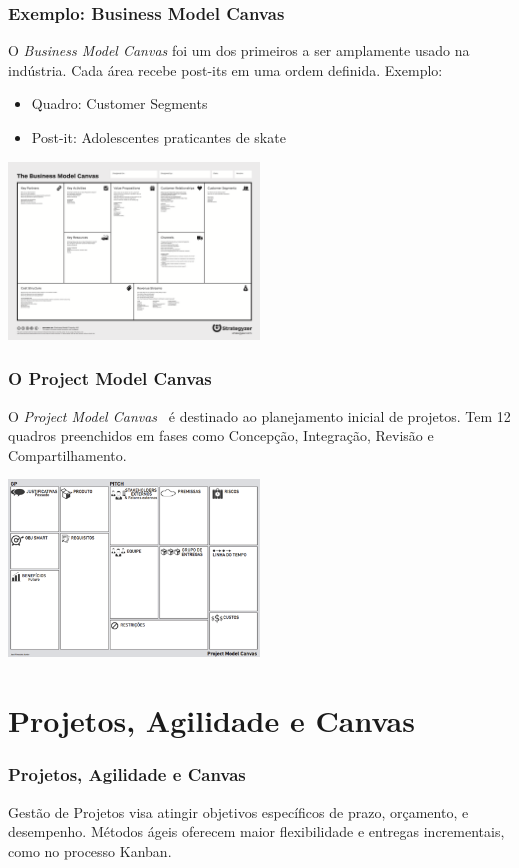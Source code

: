 \documentclass[aspectratio=169]{beamer}
\begin{document}
\begin{frame}
\frametitle{Exemplo: Business Model Canvas}
O \textit{Business Model Canvas} foi um dos primeiros a ser amplamente usado na indústria. Cada área recebe post-its em uma ordem definida. Exemplo:
\begin{itemize}
    \item Quadro: Customer Segments
    \item Post-it: Adolescentes praticantes de skate
\end{itemize}

\centering
\includegraphics[width=0.5\textwidth]{imagens/BMC.png}
\end{frame}



\begin{frame}
\frametitle{O Project Model Canvas}
O \textit{Project Model Canvas}~\citep{finocchio:2013} é destinado ao planejamento inicial de projetos. Tem 12 quadros preenchidos em fases como Concepção, Integração, Revisão e Compartilhamento.

\centering
\includegraphics[width=0.5\textwidth]{imagens/ProjectMdoel Canvas.png}
\end{frame}





\section{Projetos, Agilidade e Canvas}

\begin{frame}
\frametitle{Projetos, Agilidade e Canvas}
Gestão de Projetos visa atingir objetivos específicos de prazo, orçamento, e desempenho. Métodos ágeis oferecem maior flexibilidade e entregas incrementais, como no processo Kanban.
\end{frame}
\end{document}
